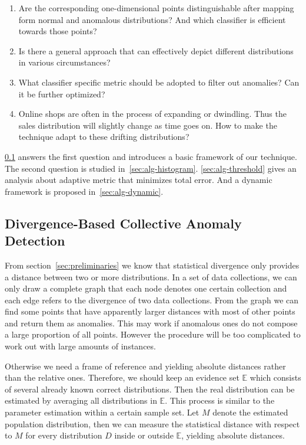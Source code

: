 \documentclass[a4paper]{IEEEtran}
\begin{document}
		\begin{enumerate}
			\item Are the corresponding one-dimensional points distinguishable after mapping form normal and anomalous distributions? And which classifier is efficient towards those points?
			\item Is there a general approach that can effectively depict different distributions in various circumstances?
			\item What classifier specific metric should be adopted to filter out anomalies? Can it be further optimized?
			\item Online shops are often in the process of expanding or dwindling. Thus the sales distribution will slightly change as time goes on. How to make the technique adapt to these drifting distributions?
		\end{enumerate}
		
		\ref{sec:alg-basic} answers the first question and introduces a basic framework of our technique. The second question is studied in~\ref{sec:alg-histogram}. \ref{sec:alg-threshold} gives an analysis about adaptive metric that minimizes total error. And a dynamic framework is proposed in~\ref{sec:alg-dynamic}.
			
		\subsection{Divergence-Based Collective Anomaly Detection}\label{sec:alg-basic}
			From section~\ref{sec:preliminaries} we know that statistical divergence only provides a distance between two or more distributions. In a set of data collections, we can only draw a complete graph that each node denotes one certain collection and each edge refers to the divergence of two data collections. From the graph we can find some points that have apparently larger distances with most of other points and return them as anomalies. This may work if anomalous ones do not compose a large proportion of all points. However the procedure will be too complicated to work out with large amounts of instances. 
			
			Otherwise we need a frame of reference and yielding absolute distances rather than the relative ones. Therefore, we should keep an evidence set $\mathbb{E}$ which consists of several already known correct distributions. Then the real distribution can be estimated by averaging all distributions in $\mathbb{E}$. This process is similar to the parameter estimation within a certain sample set. Let $M$ denote the estimated population distribution, then we can measure the statistical distance with respect to $M$ for every distribution $D$ inside or outside $\mathbb{E}$, yielding absolute distances. 
			
\end{document}
